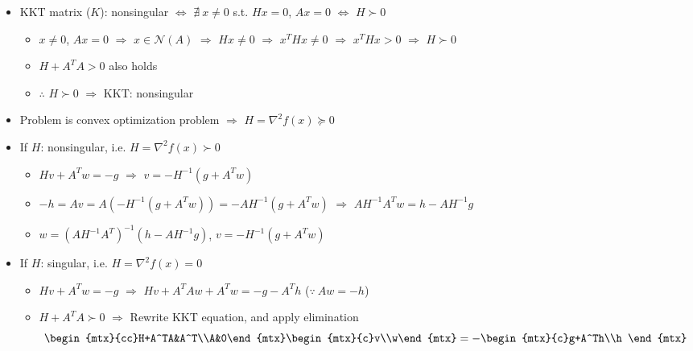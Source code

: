\begin{itemize}
    \item KKT matrix ($K$): nonsingular $\Leftrightarrow$ $\nexists~x\neq 0$ s.t. $Hx=0$, $Ax=0$ $\Leftrightarrow$ $H\succ 0$
    \begin{itemize}
        \item $x\neq 0$, $Ax=0$ $\Rightarrow$ $x\in\mathcal{N}(A)$ $\Rightarrow$ $Hx\neq 0$ $\Rightarrow$ $x^THx\neq 0$ $\Rightarrow$ $x^THx>0$ $\Rightarrow$ $H\succ 0$
        \item $H+A^TA>0$ also holds
        \item $\therefore$ $H\succ 0$ $\Rightarrow$ KKT: nonsingular
    \end{itemize}
    \item Problem is convex optimization problem $\Rightarrow$ $H=\nabla^2 f(x)\succeq 0$
    \item If $H$: nonsingular, i.e. $H=\nabla^2 f(x)\succ 0$
    \begin{itemize}
        \item $Hv+A^Tw=-g$ $\Rightarrow$ $v=-H^{-1}(g+A^Tw)$
        \item $-h=Av=A\left(-H^{-1}(g+A^Tw)\right)=-AH^{-1}(g+A^Tw)$ $\Rightarrow$ $AH^{-1}A^Tw=h-AH^{-1}g$
        \item $w=\left(AH^{-1}A^T\right)^{-1}\left(h-AH^{-1}g\right)$, $v=-H^{-1}\left(g+A^Tw\right)$
    \end{itemize}
    \item If $H$: singular, i.e. $H=\nabla^2 f(x)=0$
    \begin{itemize}
        \item $Hv+A^Tw=-g$ $\Rightarrow$ $Hv+A^TAw+A^Tw=-g-A^Th$ ($\because~Aw=-h$)
        \item $H+A^TA\succ 0$ $\Rightarrow$ Rewrite KKT equation, and apply elimination
        \begin{equation}
            \begin{mtx}{cc}H+A^TA&A^T\\A&0\end{mtx}\begin{mtx}{c}v\\w\end{mtx}=-\begin{mtx}{c}g+A^Th\\h
        \end{mtx}\end{equation}
    \end{itemize}
\end{itemize}


